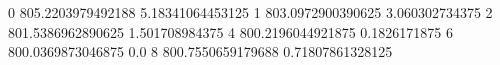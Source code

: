 0 805.2203979492188 5.18341064453125
1 803.0972900390625 3.060302734375
2 801.5386962890625 1.501708984375
4 800.2196044921875 0.1826171875
6 800.0369873046875 0.0
8 800.7550659179688 0.71807861328125
